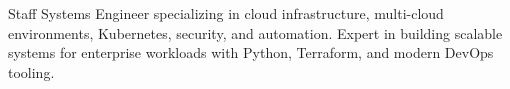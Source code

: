
\begin{cvparagraph}
	{Staff Systems Engineer specializing in cloud infrastructure, multi-cloud environments, Kubernetes, security, and automation. Expert in building scalable systems for enterprise workloads with Python, Terraform, and modern DevOps tooling.}
\end{cvparagraph}